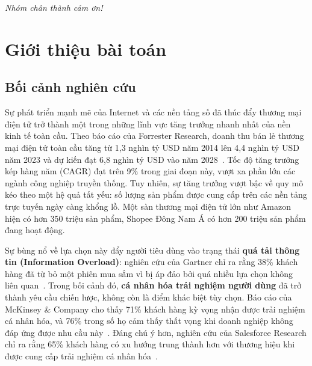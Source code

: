 \documentclass{report}
\makeatletter
\let\ps@plain\ps@fancy
\makeatother
\begin{document}
\bigskip
\noindent\textit{Nhóm chân thành cảm ơn!}

\clearpage
\makeatletter\let\ps@plain\ps@empty\makeatother
{}
\listoffigures
\clearpage

\clearpage
\makeatletter\let\ps@plain\ps@empty\makeatother
{}
\listoftables
\clearpage

\clearpage
\makeatletter\let\ps@plain\ps@empty\makeatother
\pagestyle{empty}
\tableofcontents
\thispagestyle{empty}
\makeatletter\let\ps@plain\ps@fancy\makeatother
\clearpage

\newpage
\pagestyle{fancy}

\chapter{Giới thiệu bài toán}
\label{chap:gioithieu}

\section{Bối cảnh nghiên cứu}

Sự phát triển mạnh mẽ của Internet và các nền tảng số đã thúc đẩy thương mại điện tử trở thành một trong những lĩnh vực tăng trưởng nhanh nhất của nền kinh tế toàn cầu. Theo báo cáo của Forrester Research, doanh thu bán lẻ thương mại điện tử toàn cầu tăng từ 1,3 nghìn tỷ USD năm 2014 lên 4,4 nghìn tỷ USD năm 2023 và dự kiến đạt 6,8 nghìn tỷ USD vào năm 2028~\cite{forrester2024}. Tốc độ tăng trưởng kép hàng năm (CAGR) đạt trên 9\% trong giai đoạn này, vượt xa phần lớn các ngành công nghiệp truyền thống. Tuy nhiên, sự tăng trưởng vượt bậc về quy mô kéo theo một hệ quả tất yếu: số lượng sản phẩm được cung cấp trên các nền tảng trực tuyến ngày càng khổng lồ. Một sàn thương mại điện tử lớn như Amazon hiện có hơn 350 triệu sản phẩm, Shopee Đông Nam Á có hơn 200 triệu sản phẩm đang hoạt động.

Sự bùng nổ về lựa chọn này đẩy người tiêu dùng vào trạng thái \textbf{quá tải thông tin (Information Overload)}: nghiên cứu của Gartner chỉ ra rằng 38\% khách hàng đã từ bỏ một phiên mua sắm vì bị áp đảo bởi quá nhiều lựa chọn không liên quan~\cite{gartner2023}. Trong bối cảnh đó, \textbf{cá nhân hóa trải nghiệm người dùng} đã trở thành yêu cầu chiến lược, không còn là điểm khác biệt tùy chọn. Báo cáo của McKinsey \& Company cho thấy 71\% khách hàng kỳ vọng nhận được trải nghiệm cá nhân hóa, và 76\% trong số họ cảm thấy thất vọng khi doanh nghiệp không đáp ứng được nhu cầu này~\cite{mckinsey2025}. Đáng chú ý hơn, nghiên cứu của Salesforce Research chỉ ra rằng 65\% khách hàng có xu hướng trung thành hơn với thương hiệu khi được cung cấp trải nghiệm cá nhân hóa~\cite{salesforce2023}.
\end{document}
